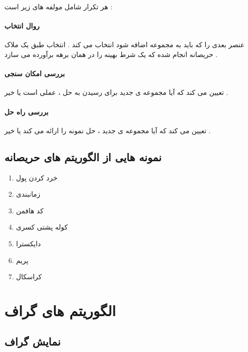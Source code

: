 \documentclass[12pt]{book}
\begin{document}
هر تکرار شامل مولفه های زیر است :

\subsubsection{روال انتخاب}
عنصر بعدی را که باید به مجموعه اضافه شود انتخاب می کند . انتخاب طبق یک ملاک حریصانه انجام شده که یک شرط بهینه را در همان برهه برآورده می سازد .


\subsubsection{بررسی امکان سنجی}
تعیین می کند که آیا مجموعه ی جدید برای رسیدن به حل ، عملی است یا خیر .


\subsubsection{بررسی راه حل}

تعیین می کند که آیا مجموعه ی جدید ، حل نمونه را ارائه می کند یا خیر .



\section{نمونه هایی از الگوریتم های حریصانه}


\begin{enumerate}
	\item خرد کردن پول
	\item زمانبندی
	\item کد هافمن
	\item کوله پشتی کسری
	\item دایکسترا
	\item پریم
	\item کراسکال
\end{enumerate}





\chapter{الگوریتم های گراف}


\section{نمایش گراف}
\end{document}
